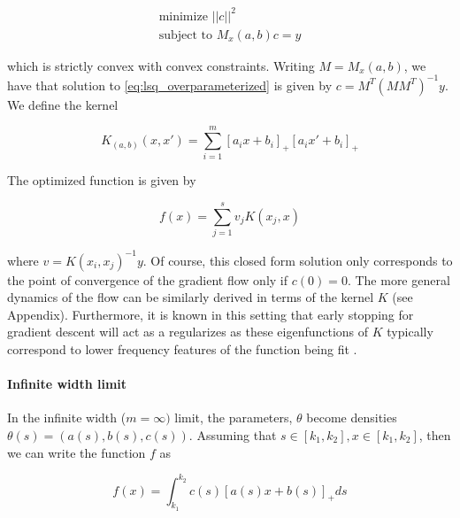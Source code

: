 \begin{equation}\label{eq:lsq_overparameterized}
\begin{gathered} 
    \text{minimize } ||c||^2\\
    \text{subject to } M_x(a, b) c = y
\end{gathered}
\end{equation}

which is strictly convex with convex constraints. Writing $M = M_x(a,b)$, we have that solution to \eqref{eq:lsq_overparameterized} is given by $c = M^T (M M^T)^{-1} y$. We define the kernel

\begin{equation}
    K_{(a,b)}(x,x') = \sum_{i=1}^m [a_i x + b_i]_+[a_i x' + b_i]_+
\end{equation}


The optimized function is given by

\begin{equation}
    f(x) = \sum_{j=1}^s v_j K(x_j, x)
\end{equation}


where $v = K(x_i,x_j)^{-1} y$. Of course, this closed form solution only corresponds to the point of convergence of the gradient flow only if $c(0) = 0$. The more general dynamics of the flow can be similarly derived in terms of the kernel $K$ (see Appendix). Furthermore, it is known in this setting that early stopping for
gradient descent will act as a regularizes as these eigenfunctions of $K$ typically correspond to lower frequency features of the function being fit .







\paragraph{Infinite width limit}
In the infinite width ($m = \infty)$ limit, the parameters, $\theta$ become densities $\theta(s) = (a(s), b(s), c(s))$. Assuming that $s \in [k_1, k_2], x \in [k_1, k_2]$, then we can write the function $f$ as

\begin{equation}
    f(x) = \int_{k_1}^{k_2} c(s) [a(s) x + b(s)]_+ ds
\end{equation}

